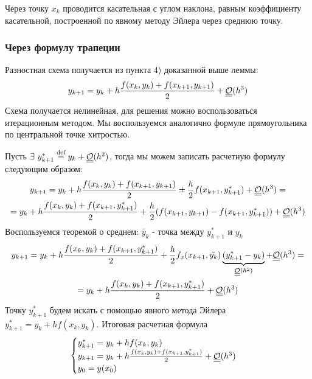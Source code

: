 Через точку $x_k$ проводится касательная с углом наклона,
равным коэффициенту касательной, построенной по явному методу Эйлера через среднюю точку.

\subsubsection*{Через формулу трапеции}
Разностная схема получается из пункта 4) доказанной выше леммы:
\[y_{k+1}=y_k+h\frac{f(x_k,y_k)+f(x_{k+1},y_{k+1})}{2}+\underline{\underline{\mathcal{O}}}(h^3)\]
Схема получается нелинейная, для решения можно воспользоваться итерационным
методом. Мы воспользуемся аналогично формуле прямоугольника по центральной
точке хитростью.

Пусть $\exists\ y_{k+1}^*\stackrel{\text{def}}{=} y_k+\underline{\underline{\mathcal{O}}}(h^2)$, тогда
мы можем записать расчетную формулу следующим образом:
\begin{multline*}
  y_{k+1}=y_k+h\frac{f(x_k,y_k)+f(x_{k+1},y_{k+1})}{2}\pm\frac{h}{2}f(x_{k+1},y_{k+1}^*)+\underline{\underline{\mathcal{O}}}(h^3)= \\
  = y_k+h\frac{f(x_k,y_k)+f(x_{k+1},y_{k+1}^*)}{2}+\frac{h}{2}(f(x_{k+1},y_{k+1})-f(x_{k+1},y_{k+1}^*))+\underline{\underline{\mathcal{O}}}(h^3)
\end{multline*}
Воспользуемся теоремой о среднем: $\tilde{y_k}$ - точка между $y_{k+1}^*$ и $y_k$
\begin{multline*}
  y_{k+1}=y_k+h\frac{f(x_k,y_k)+f(x_{k+1},y_{k+1}^*)}{2}+\frac{h}{2}f_x(x_{k+1},\tilde{y_k})\underbrace{(y_{k+1}^*-y_k)}_{\underline{\underline{\mathcal{O}}}(h^2)}+\underline{\underline{\mathcal{O}}}(h^3)= \\
  =y_k+h\frac{f(x_k,y_k)+f(x_{k+1},y_{k+1}^*)}{2}+\underline{\underline{\mathcal{O}}}(h^3)
\end{multline*}
Точку $y_{k+1}^*$ будем искать с помощью явного метода Эйлера $y_{k+1}^*=y_k+hf(x_k,y_k)$.
Итоговая расчетная формула
\[\begin{cases}
    y_{k+1}^*=y_k+hf(x_k,y_k)                                         \\
    y_{k+1}=y_k+h\frac{f(x_k,y_k)+f(x_{k+1},y_{k+1}^*)}{2}+\underline{\underline{\mathcal{O}}}(h^3) \\
    y_0=y(x_0)
  \end{cases}\]

